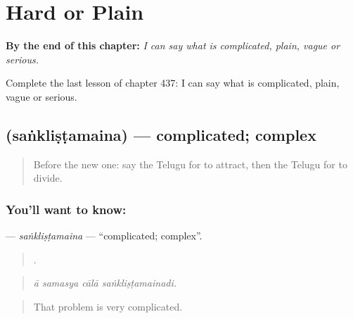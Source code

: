 
\chapter{Hard or Plain}
\label{ch:te-hard-or-plain}

\begin{chapteropening}
\textbf{By the end of this chapter:} \emph{I can say what is complicated, plain, vague or serious.}

Complete the last lesson of chapter 437: I can say what is complicated, plain, vague or serious.
\end{chapteropening}

\section[\texorpdfstring{\te{సంక్లిష్టమైన} (saṅkliṣṭamaina)}{సంక్లిష్టమైన (saṅkliṣṭamaina)}]{ (saṅkliṣṭamaina) — complicated; complex}

\label{lesson:TE-C437-sanklistamaina}



\begin{quote}
Before the new one: say the Telugu for to attract, then the Telugu for to divide.
\end{quote}

\subsection*{You'll want to know: }
\textbf{} — \emph{saṅkliṣṭamaina} — \textquotedblleft{}complicated; complex\textquotedblright{}.

\begin{quote}
   .
\end{quote}

\begin{quote}
\emph{ā samasya cālā saṅkliṣṭamainadi.}
\end{quote}

\begin{quote}
That problem is very complicated.
\end{quote}

